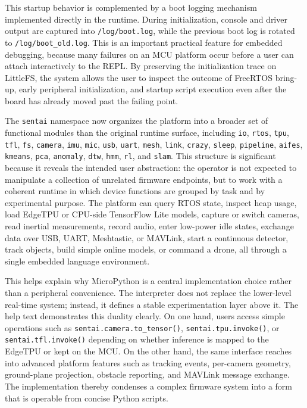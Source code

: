 This startup behavior is complemented by a boot logging mechanism
implemented directly in the runtime. During initialization, console and
driver output are captured into \texttt{/log/boot.log}, while the
previous boot log is rotated to \texttt{/log/boot\_old.log}. This is an
important practical feature for embedded debugging, because many
failures on an MCU platform occur before a user can attach interactively
to the REPL. By preserving the initialization trace on LittleFS, the
system allows the user to inspect the outcome of FreeRTOS bring-up,
early peripheral initialization, and startup script execution even after
the board has already moved past the failing point.

The \texttt{sentai} namespace now organizes the platform into a broader
set of functional modules than the original runtime surface, including
\texttt{io}, \texttt{rtos}, \texttt{tpu}, \texttt{tfl}, \texttt{fs},
\texttt{camera}, \texttt{imu}, \texttt{mic}, \texttt{usb},
\texttt{uart}, \texttt{mesh}, \texttt{link}, \texttt{crazy},
\texttt{sleep}, \texttt{pipeline}, \texttt{aifes}, \texttt{kmeans},
\texttt{pca}, \texttt{anomaly}, \texttt{dtw}, \texttt{hmm}, \texttt{rl},
and \texttt{slam}. This structure is significant because it reveals the
intended user abstraction: the operator is not expected to manipulate a
collection of unrelated firmware endpoints, but to work with a coherent
runtime in which device functions are grouped by task and by
experimental purpose. The platform can query RTOS state, inspect heap
usage, load EdgeTPU or CPU-side TensorFlow Lite models, capture or
switch cameras, read inertial measurements, record audio, enter
low-power idle states, exchange data over USB, UART, Meshtastic, or
MAVLink, start a continuous detector, track objects, build simple online
models, or command a drone, all through a single embedded language
environment.

This helps explain why MicroPython is a central implementation choice
rather than a peripheral convenience. The interpreter does not replace
the lower-level real-time system; instead, it defines a stable
experimentation layer above it. The help text demonstrates this duality
clearly. On one hand, users access simple operations such as
\texttt{sentai.camera.to\_tensor()}, \texttt{sentai.tpu.invoke()}, or
\texttt{sentai.tfl.invoke()} depending on whether inference is mapped to
the EdgeTPU or kept on the MCU. On the other hand, the same interface
reaches into advanced platform features such as tracking events,
per-camera geometry, ground-plane projection, obstacle reporting, and
MAVLink message exchange. The implementation thereby condenses a complex
firmware system into a form that is operable from concise Python
scripts.

